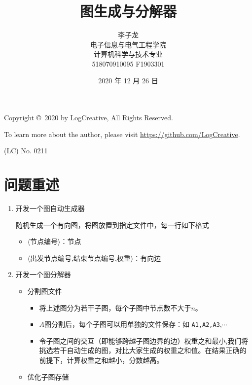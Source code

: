 \documentclass[a4paper,12pt]{article}
\begin{document}
\begin{CJK}{UTF8}{song}
\title{图生成与分解器}
\author{李子龙\\\small 电子信息与电气工程学院\\\small 计算机科学与技术专业\\\small 518070910095 F1903301}
\date{2020 年 12 月 26 日}
\maketitle
\normalsize

\begin{tcolorbox}
    Copyright \copyright\ 2020 by LogCreative, All Rights Reserved.
    
    To learn more about the author, please visit \href{https://github.com/LogCreative}{https://github.com/LogCreative}.

    (LC) No. 0211
\end{tcolorbox}

\section{问题重述}

\begin{enumerate}
    \item 开发一个图自动生成器
    
    随机生成一个有向图，将图放置到指定文件中，每一行如下格式
    \begin{itemize}
        \item $\langle$节点编号$\rangle$：节点
        \item $\langle$出发节点编号,结束节点编号,权重$\rangle$：有向边
    \end{itemize}

    \item 开发一个图分解器
    \begin{itemize}
        \item 分割图文件
        \begin{itemize}
            \item 将上述图分为若干子图，每个子图中节点数不大于$n$。
            \item $A$图分割后，每个子图可以用单独的文件保存：如 \texttt{A1,A2,A3},$\cdots$
            \item 令子图之间的交互（即能够跨越子图边界的边）权重之和最小,我们将挑选若干自动生成的图，对比大家生成的权重之和值。在结果正确的前提下，计算权重之和越小，分数越高。
        \end{itemize}
        \item 优化子图存储
        

\end{itemize}
\end{enumerate}
\end{CJK}
\end{document}
